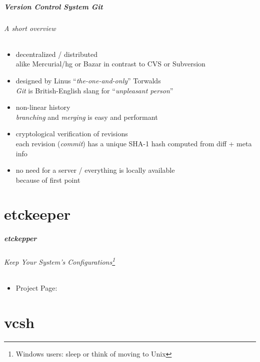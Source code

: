 \documentclass[english,hyperref={pdfpagelabels=false},aspectratio=169]{beamer}
\begin{document}
\begin{frame}[label=git]
  \frametitle{Version Control System \textit{Git}}
  \framesubtitle{A short overview}
  \begin{itemize}
    \item decentralized / distributed\\
      {\scriptsize alike Mercurial/hg or Bazar in contrast to CVS or Subversion}
    \item designed by Linus ``\textit{the-one-and-only}'' Torwalds\\
      {\scriptsize\textit{Git} is British-English slang for ``\textit{unpleasant person}''}
    \item non-linear history\\
      {\scriptsize \textit{branching} and \textit{merging} is easy and performant}
    \item cryptological verification of revisions\\
      {\scriptsize each revision (\textit{commit}) has a unique SHA-1 hash computed from diff + meta info}
    \item no need for a server / everything is locally available\\
      {\scriptsize because of first point}
  \end{itemize}
\end{frame}



\part{etckeeper}
\makepart

\begin{frame}[label=etckeeper]
  \frametitle{etckepper}
  \framesubtitle{Keep Your System's Configurations\footnote{\tiny Windows users: sleep or think of moving to Unix}}
  \begin{itemize}
    \item Project Page: \url{}
  \end{itemize}
\end{frame}


\part{vcsh}
\makepart
\end{document}
